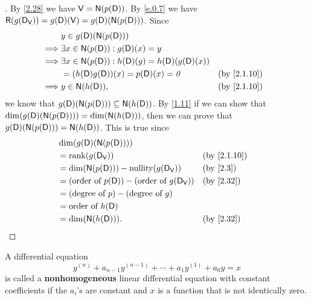 \begin{proof}[]
  By \cref{2.28} we have \(\V = \ns{p(\Dop)}\).
  By \cref{e.0.7} we have \(\rg{g(\Dop_{\V})} = g(\Dop)(\V) = g(\Dop)(\ns{p(\Dop)})\).
  Since
  \begin{align*}
             & y \in g(\Dop)(\ns{p(\Dop)})                                                    \\
    \implies & \exists x \in \ns{p(\Dop)} : g(\Dop)(x) = y                                    \\
    \implies & \exists x \in \ns{p(\Dop)} : h(\Dop)(y) = h(\Dop)(g(\Dop)(x))                  \\
             & = (h(\Dop) g(\Dop))(x) = p(\Dop)(x) = \zv                     &  & \by{2.1.10} \\
    \implies & y \in \ns{h(\Dop)},                                           &  & \by{2.1.10}
  \end{align*}
  we know that \(g(\Dop)(\ns{p(\Dop)}) \subseteq \ns{h(\Dop)}\).
  By \cref{1.11} if we can show that \(\dim(g(\Dop)(\ns{p(\Dop)})) = \dim(\ns{h(\Dop)})\), then we can prove that \(g(\Dop)(\ns{p(\Dop)}) = \ns{h(\Dop)}\).
  This is true since
  \begin{align*}
     & \dim(g(\Dop)(\ns{p(\Dop)}))                                                     \\
     & = \rk{g(\Dop_{\V})}                                            &  & \by{2.1.10} \\
     & = \dim(\ns{p(\Dop)}) - \nt{g(\Dop_{\V})}                       &  & \by{2.3}    \\
     & = (\text{order of } p(\Dop)) - (\text{order of } g(\Dop_{\V})) &  & \by{2.32}   \\
     & = (\text{degree of } p) - (\text{degree of } g)                                 \\
     & = \text{order of } h(\Dop)                                                      \\
     & = \dim(\ns{h(\Dop)}).                                          &  & \by{2.32}
  \end{align*}
\end{proof}

\begin{defn}\label{2.7.16}
  A differential equation
  \[
    y^{(n)} + a_{n - 1} y^{(n - 1)} + \cdots + a_1 y^{(1)} + a_0 y = x
  \]
  is called a \textbf{nonhomogeneous} linear differential equation with constant coefficients if the \(a_i\)'s are constant and \(x\) is a function that is not identically zero.
\end{defn}

